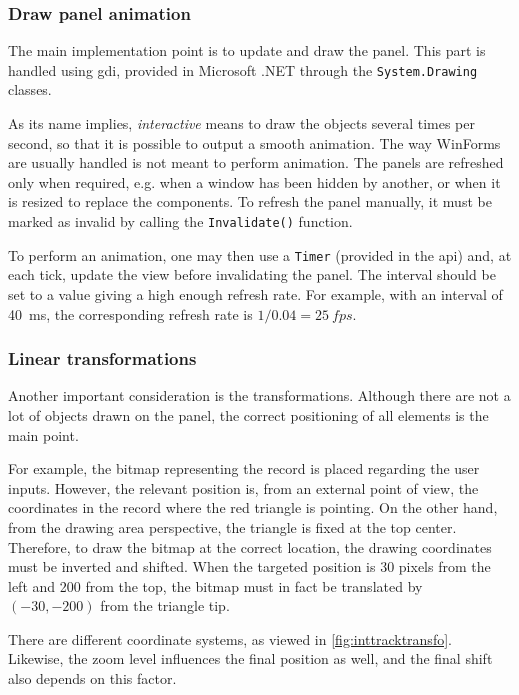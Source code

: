 \subsubsection{Draw panel animation}

The main implementation point is to update and draw the panel. This part is handled using \gls{gdi}, provided in Microsoft .NET through the \texttt{System.Drawing} classes.

As its name implies, \emph{interactive} means to draw the objects several times per second, so that it is possible to output a smooth animation. The way WinForms are usually handled is not meant to perform animation. The panels are refreshed only when required, e.g. when a window has been hidden by another, or when it is resized to replace the components. To refresh the panel manually, it must be marked as invalid by calling the \texttt{Invalidate()} function.

To perform an animation, one may then use a \texttt{Timer} (provided in the \gls{api}) and, at each tick, update the view before invalidating the panel. The interval should be set to a value giving a high enough refresh rate. For example, with an interval of \SI{40}{\milli\second}, the corresponding refresh rate is $1/0.04 = \SI{25}{fps}$.

\subsubsection{Linear transformations}

Another important consideration is the transformations. Although there are not a lot of objects drawn on the panel, the correct positioning of all elements is the main point.

For example, the bitmap representing the record is placed regarding the user inputs. However, the relevant position is, from an external point of view, the coordinates in the record where the red triangle is pointing. On the other hand, from the drawing area perspective, the triangle is fixed at the top center. Therefore, to draw the bitmap at the correct location, the drawing coordinates must be inverted and shifted. When the targeted position is 30 pixels from the left and 200 from the top, the bitmap must in fact be translated by $(-30,-200)$ from the triangle tip.

There are different coordinate systems, as viewed in \autoref{fig:inttracktransfo}. Likewise, the zoom level influences the final position as well, and the final shift also depends on this factor.

